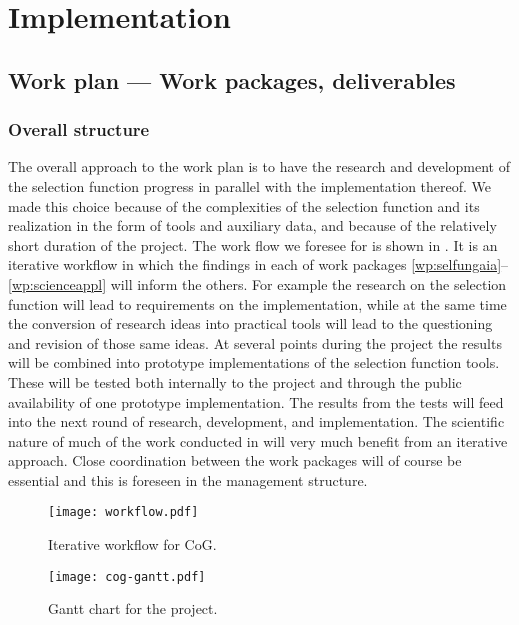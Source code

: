 \chapter{Implementation}
\label{cha:implementation}

\section{Work plan --- Work packages, deliverables}
\label{sec:work-plan}

\subsection{Overall structure}
\label{sec:wpstructure}

The overall approach to the work plan is to have the research and development of the selection function progress in parallel with the implementation thereof. We made this choice because of the complexities of the selection function and its realization in the form of tools and auxiliary data, and because of the relatively short duration of the project. The work flow we foresee for {\acro} is shown in . It is an iterative workflow in which the findings in each of work packages \ref{wp:selfungaia}--\ref{wp:scienceappl} will inform the others. For example the research on the selection function will lead to requirements on the implementation, while at the same time the conversion of research ideas into practical tools will lead to the questioning and revision of those same ideas. At several points during the project the results will be combined into prototype implementations of the selection function tools. These will be tested both internally to the project and through the public availability of one prototype implementation. The results from the tests will feed into the next round of research, development, and implementation. The scientific nature of much of the work conducted in {\acro} will very much benefit from an iterative approach. Close coordination between the work packages will of course be essential and this is foreseen in the management structure.

\begin{figure}
    \centering
    \texttt{[image: workflow.pdf]}
    \caption{Iterative workflow for CoG.}
    \label{fig:workflow}
\end{figure}

\begin{figure}[ht!]
    \centering
    \texttt{[image: cog-gantt.pdf]}
    \caption{Gantt chart for the {\acro} project.}
    \label{fig:gantt}
\end{figure}

